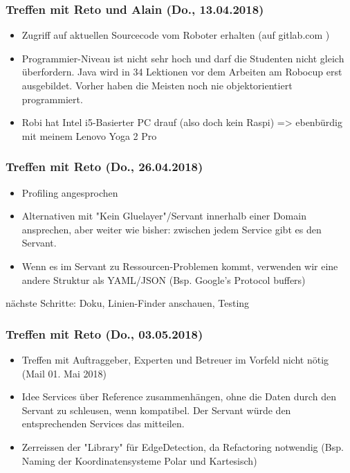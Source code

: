 \subsubsection{Treffen mit Reto und Alain (Do., 13.04.2018)}
\begin{itemize}
	\item Zugriff auf aktuellen Sourcecode vom Roboter erhalten (auf gitlab.com \cite{gitlab.com/solidus/hefei})
	\item Programmier-Niveau ist nicht sehr hoch und darf die Studenten nicht gleich überfordern. Java wird in 34 Lektionen vor dem Arbeiten am Robocup erst ausgebildet. Vorher haben die Meisten noch nie objektorientiert programmiert.
	\item Robi hat Intel i5-Basierter PC drauf (also doch kein Raspi) => ebenbürdig mit meinem Lenovo Yoga 2 Pro
\end{itemize}

\subsubsection{Treffen mit Reto (Do., 26.04.2018)}
\begin{itemize}
	\item Profiling angesprochen
	\item Alternativen mit "Kein Gluelayer"/Servant innerhalb einer Domain ansprechen, aber weiter wie bisher: zwischen jedem Service gibt es den Servant.
	\item Wenn es im Servant zu Ressourcen-Problemen kommt, verwenden wir eine andere Struktur als YAML/JSON (Bsp. Google's Protocol buffers)
\end{itemize}
nächste Schritte: Doku, Linien-Finder anschauen, Testing

\subsubsection{Treffen mit Reto (Do., 03.05.2018)}
\begin{itemize}
	\item Treffen mit Auftraggeber, Experten und Betreuer im Vorfeld nicht nötig (Mail 01. Mai 2018)
	\item Idee Services über Reference zusammenhängen, ohne die Daten durch den Servant zu schleusen, wenn kompatibel. Der Servant würde den entsprechenden Services das mitteilen.
	\item Zerreissen der "Library" für EdgeDetection, da Refactoring notwendig (Bsp. Naming der Koordinatensysteme Polar und Kartesisch)
\end{itemize}

